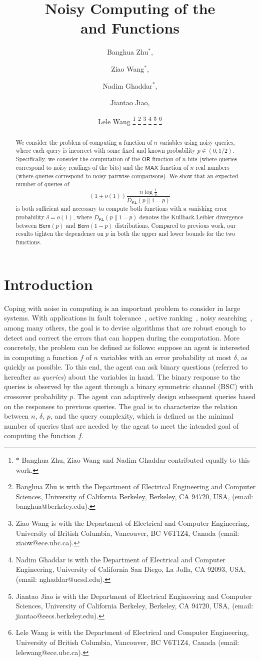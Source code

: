 \documentclass[journal, onecolumn]{IEEEtran}
\title{Noisy Computing of the \orn \\ and \maxn Functions}
\author{Banghua Zhu$^*$,
\and Ziao Wang$^*$,
\and Nadim Ghaddar$^*$,
\and Jiantao Jiao,
\and Lele Wang
\thanks{$*$ Banghua Zhu, Ziao Wang and Nadim Ghaddar contributed equally to this work.}
\thanks{Banghua Zhu is with the Department of Electrical Engineering and Computer Sciences, University of California Berkeley, Berkeley, CA 94720, USA, (email: banghua@berkeley.edu).}
\thanks{Ziao Wang is with the Department of Electrical and Computer Engineering, University of British Columbia, Vancouver, BC V6T1Z4, Canada (email: ziaow@ece.ubc.ca).}
\thanks{Nadim Ghaddar is with the Department of Electrical and Computer Engineering, University of California San Diego, La Jolla, CA 92093, USA, (email: nghaddar@ucsd.edu).}
\thanks{Jiantao Jiao is with the Department of Electrical Engineering and Computer Sciences, University of California Berkeley, Berkeley, CA 94720, USA, (email: jiantao@eecs.berkeley.edu).}
\thanks{Lele Wang is with the Department of Electrical and Computer Engineering, University of British Columbia, Vancouver, BC V6T1Z4, Canada (email: lelewang@ece.ubc.ca).}
}
\theoremstyle{plain}
\theoremstyle{definition}
\theoremstyle{remark}
\begin{document}
\maketitle

\begin{abstract}
We consider the problem of computing a function of $n$ variables using noisy queries, where each query is incorrect with some fixed and known probability $p \in (0,1/2)$. Specifically, we consider the computation of the $\mathsf{OR}$ function of $n$ bits (where queries correspond to noisy readings of the bits) and the $\mathsf{MAX}$ function of $n$ real numbers (where queries correspond to noisy pairwise comparisons). We show that an expected number of queries of
\[
(1 \pm o(1)) \frac{n\log \frac{1}{\delta}}{D_{\mathsf{KL}}(p \| 1-p)}
\]
is both sufficient and necessary to compute both functions with a vanishing error probability $\delta = o(1)$, where $D_{\mathsf{KL}}(p \| 1-p)$ denotes the Kullback-Leibler divergence between $\mathsf{Bern}(p)$ and $\mathsf{Bern}(1-p)$ distributions. Compared to previous work, our results tighten the dependence on $p$ in both the upper and lower bounds for the two functions.
\end{abstract}




\section{Introduction}
Coping with noise in computing is an important problem to consider in large systems. With applications in fault tolerance~\citep{Hastad1987,Pease1980,pippenger1991lower}, active ranking~\citep{Shah2018,Agarwal2017,Falahatgar2017,Heckel2019,wang2022noisy,Gu-Xu2023}, noisy searching~\citep{Berlekamp1964,Horstein1963,Burnashev1974,pelc1989searching, Karp2007}, among many others, the goal is to devise algorithms that are robust enough to detect and correct the errors that can happen during the computation. More concretely, the problem can be defined as follows: suppose an agent is interested in computing a function $f$ of $n$ variables with an error probability at most $\delta$, as quickly as possible. To this end, the agent can ask binary questions (referred to hereafter as \emph{queries}) about the variables in hand. The binary response to the queries is observed by the agent through a binary symmetric channel (BSC) with crossover probability $p$. The agent can adaptively design subsequent queries based on the responses to previous queries. The goal is to characterize the relation between $n$, $\delta$, $p$, and the query complexity, which is defined as the minimal number of queries that are needed by the agent to meet the intended goal of computing the function $f$.
\end{document}

